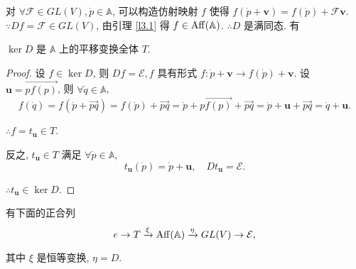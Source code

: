\documentclass[color=black,device=normal,lang=cn,mode=geye]{elegantnote}
\begin{document}
对 $\forall\mathcal{F}\in GL (V),\dot{p}\in\mathbb{A}$, 可以构造仿射映射 $f$ 使得 $f(\dot{p}+\boldsymbol{v})=f(\dot{p})+\mathcal{F}\boldsymbol{v}$. $\because Df=\mathcal{F}\in GL (V)$, 由引理 \ref{l3.1} 得 $f\in\operatorname{Aff} (\mathbb{A})$. $\therefore D$ 是满同态. 有
\begin{lemma}
    $\ker D$ 是 $\mathbb{A}$ 上的平移变换全体 $T$.
\end{lemma}
\begin{proof}
    设 $f\in\ker D$, 则 $Df=\mathcal{E},f$ 具有形式 $f:\dot{p}+\boldsymbol{v}\to f(\dot{p})+\boldsymbol{v}$. 设 $\boldsymbol{u}=\overrightarrow{pf(p)}$, 则 $\forall\dot{q}\in\mathbb{A}$,
    \[f(\dot{q})=f(\dot{p}+\overrightarrow{pq})=f(\dot{p})+\overrightarrow{pq}=\dot{p}+\overrightarrow{pf(p)}+\overrightarrow{pq}=\dot{p}+\boldsymbol{u}+\overrightarrow{pq}=\dot{q}+\boldsymbol{u}.\]

    $\therefore f=t_{\boldsymbol{u}}\in T$.

    反之, $t_{\boldsymbol{u}}\in T$ 满足 $\forall\dot{p}\in\mathbb{A}$,
    \[t_{\boldsymbol{u}}(\dot{p})=\dot{p}+\boldsymbol{u},\quad Dt_{\boldsymbol{u}}=\mathcal{E}.\]

    $\therefore t_{\boldsymbol{u}}\in\ker D$.
\end{proof}
有下面的正合列
\begin{equation}\label{eq3.1}
    e\to T\xrightarrow{\xi}\operatorname{Aff} (\mathbb{A})\xrightarrow{\eta} GL (V)\to\mathcal{E},
\end{equation}

其中 $\xi$ 是恒等变换, $\eta=D$.
\end{document}
